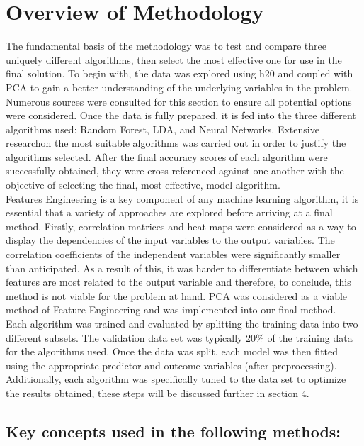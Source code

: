 \documentclass{article}
\begin{document}
\section{Overview of Methodology}
The fundamental basis of the methodology was to test and compare three uniquely different algorithms, then select the most effective one for use in the final solution. To begin with, the data was explored using h20 and coupled with PCA to gain a better understanding of the underlying variables in the problem. Numerous sources\cite{source1,source2,source3} were consulted for this section to ensure all potential options were considered. Once the data is fully prepared, it is fed into the three different algorithms used: Random Forest, LDA, and Neural Networks. Extensive research\cite{h2o,research2}on the most suitable algorithms was carried out in order to justify the algorithms selected. After the final accuracy scores of each algorithm were successfully obtained, they were cross-referenced against one another with the objective of selecting the final, most effective,  model algorithm.\\

Features Engineering is a key component of any machine learning algorithm, it is essential that a variety of approaches are explored before arriving at a final method. Firstly, correlation matrices and heat maps were considered as a way to display the dependencies of the input variables to the output variables. The correlation coefficients of the independent variables were significantly smaller than anticipated. As a result of this, it was harder to differentiate between which features are most related to the output variable and therefore, to conclude, this method is not viable for the problem at hand. PCA was considered as a viable method of Feature Engineering and was implemented into our final method. \\

Each algorithm was trained and evaluated by splitting the training data into two different subsets. The validation data set was typically 20\% of the training data for the algorithms used. Once the data was split, each model was then fitted using the appropriate predictor and outcome variables (after preprocessing). Additionally, each algorithm was specifically tuned to the data set to optimize the results obtained, these steps will be discussed further in section 4.

\subsection{Key concepts used in the following methods:}
\label{sec:key}
\end{document}
